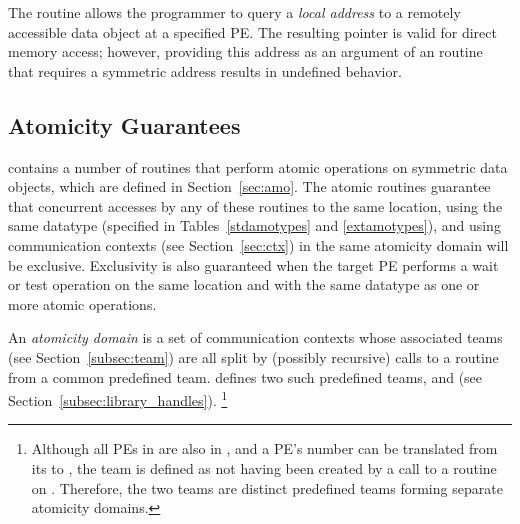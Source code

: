 The  routine allows the programmer to query a {\em local
address} to a remotely accessible data object at a specified \ac{PE}.  The
resulting pointer is valid for direct memory access; however, providing this
address as an argument of an \openshmem routine that requires a symmetric
address results in undefined behavior.

\subsection{Atomicity Guarantees}\label{subsec:amo_guarantees}

\openshmem contains a number of routines that perform atomic operations on
symmetric data objects, which are defined in Section~\ref{sec:amo}.
The atomic routines
guarantee that concurrent accesses by any of these routines to the same
location, using the same datatype (specified in Tables~\ref{stdamotypes} and
\ref{extamotypes}), and using communication contexts (see Section~\ref{sec:ctx})
in the same atomicity domain will be exclusive.
Exclusivity is also guaranteed when the target \ac{PE} performs a wait or test
operation on the same location and with the same datatype as one or more atomic
operations.

An \openshmem \emph{atomicity domain} is a set of communication
contexts whose associated teams (see Section~\ref{subsec:team}) are
all split by (possibly recursive) calls to a
 routine from a common predefined team.
\openshmem defines two such predefined teams, 
and  (see Section~\ref{subsec:library_handles}).%
\footnote{
  Although all \acp{PE} in  are also
  in , and a \ac{PE}'s number can be
  translated from its  to
  , the
   team is defined as not having
  been created by a call to a  routine on
  .
  Therefore, the two teams are distinct predefined teams forming
  separate atomicity domains.
}

